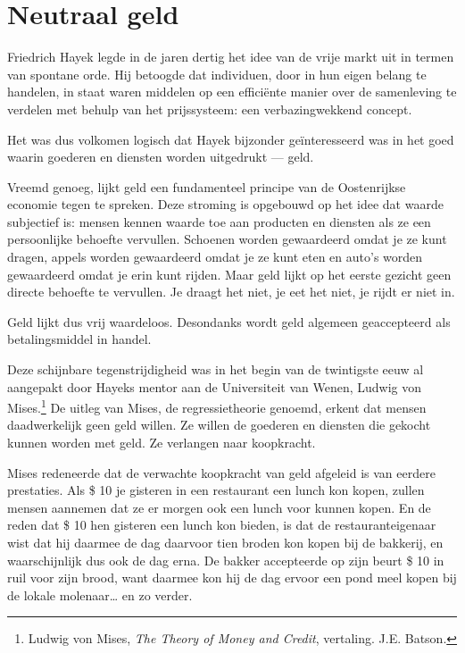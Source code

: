 \documentclass[
  a5paper,
  smalldemyvopaper,11pt,twoside,onecolumn,openright,extrafontsizes,
hidelinks]{memoir}
\begin{document}
\chapter{Neutraal geld}\label{neutraal-geld}

Friedrich Hayek legde in de jaren dertig het idee van de vrije markt uit
in termen van spontane orde. Hij betoogde dat individuen, door in hun
eigen belang te handelen, in staat waren middelen op een efficiënte
manier over de samenleving te verdelen met behulp van het prijssysteem:
een verbazingwekkend concept.

Het was dus volkomen logisch dat Hayek bijzonder geïnteresseerd was in
het goed waarin goederen en diensten worden uitgedrukt --- geld.

Vreemd genoeg, lijkt geld een fundamenteel principe van de Oostenrijkse
economie tegen te spreken. Deze stroming is opgebouwd op het idee dat
waarde subjectief is: mensen kennen waarde toe aan producten en diensten
als ze een persoonlijke behoefte vervullen. Schoenen worden gewaardeerd
omdat je ze kunt dragen, appels worden gewaardeerd omdat je ze kunt eten
en auto's worden gewaardeerd omdat je erin kunt rijden. Maar geld lijkt
op het eerste gezicht geen directe behoefte te vervullen. Je draagt het
niet, je eet het niet, je rijdt er niet in.

Geld lijkt dus vrij waardeloos. Desondanks wordt geld algemeen
geaccepteerd als betalingsmiddel in handel.

Deze schijnbare tegenstrijdigheid was in het begin van de twintigste
eeuw al aangepakt door Hayeks mentor aan de Universiteit van Wenen,
Ludwig von Mises.\footnote{\hspace{0pt}Ludwig von Mises, \emph{The
  Theory of Money and Credit}, vertaling. J.E. Batson.} De uitleg van
Mises, de regressietheorie genoemd, erkent dat mensen daadwerkelijk geen
geld willen. Ze willen de goederen en diensten die gekocht kunnen worden
met geld. Ze verlangen naar koopkracht.

Mises redeneerde dat de verwachte koopkracht van geld afgeleid is van
eerdere prestaties. Als \$ 10 je gisteren in een restaurant een lunch
kon kopen, zullen mensen aannemen dat ze er morgen ook een lunch voor
kunnen kopen. En de reden dat \$ 10 hen gisteren een lunch kon bieden,
is dat de restauranteigenaar wist dat hij daarmee de dag daarvoor tien
broden kon kopen bij de bakkerij, en waarschijnlijk dus ook de dag erna.
De bakker accepteerde op zijn beurt \$ 10 in ruil voor zijn brood, want
daarmee kon hij de dag ervoor een pond meel kopen bij de lokale
molenaar\ldots{} en zo verder.
\end{document}
